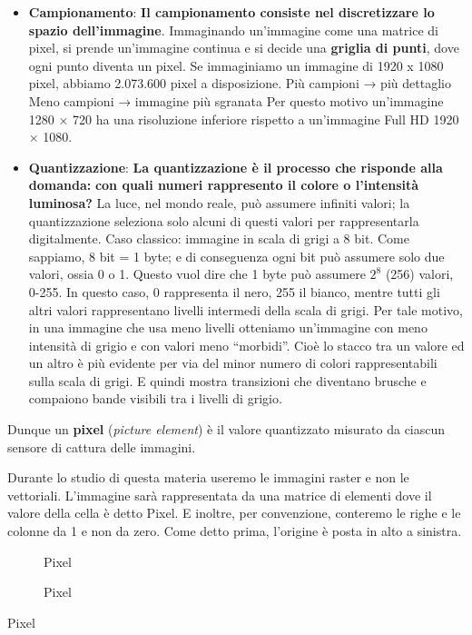 \documentclass[
]{article}
\providecommand{\tightlist}{%
  \setlength{\itemsep}{0pt}\setlength{\parskip}{0pt}}
\begin{document}
\begin{itemize}
\tightlist
\item
  \textbf{Campionamento}:
  \textbf{Il campionamento consiste nel discretizzare lo spazio dell'immagine}. Immaginando un'immagine come una matrice di pixel, si prende un'immagine continua e si decide una \textbf{griglia di punti}, dove ogni punto diventa un pixel.
  Se immaginiamo un immagine di 1920 x 1080 pixel, abbiamo 2.073.600 pixel a disposizione.
  Più campioni → più dettaglio
  Meno campioni → immagine più sgranata
  Per questo motivo un'immagine 1280 × 720 ha una risoluzione inferiore rispetto a un'immagine Full HD 1920 × 1080.
\item
  \textbf{Quantizzazione}:
  \textbf{La quantizzazione è il processo che risponde alla domanda:} \textbf{con quali numeri rappresento il colore o l'intensità luminosa?} La luce, nel mondo reale, può assumere infiniti valori; la quantizzazione seleziona solo alcuni di questi valori per rappresentarla digitalmente.
  Caso classico: immagine in scala di grigi a 8 bit.
  Come sappiamo, 8 bit = 1 byte; e di conseguenza ogni bit può assumere solo due valori, ossia 0 o 1. Questo vuol dire che 1 byte può assumere \(2^8\) (256) valori, 0-255. In questo caso, 0 rappresenta il nero, 255 il bianco, mentre tutti gli altri valori rappresentano livelli intermedi della scala di grigi.
  Per tale motivo, in una immagine che usa meno livelli otteniamo un'immagine con meno intensità di grigio e con valori meno ``morbidi''. Cioè lo stacco tra un valore ed un altro è più evidente per via del minor numero di colori rappresentabili sulla scala di grigi. E quindi mostra transizioni che diventano brusche e compaiono bande visibili tra i livelli di grigio.
\end{itemize}

Dunque un \textbf{pixel} (\emph{picture element}) è il valore quantizzato misurato da ciascun sensore di cattura delle immagini.

Durante lo studio di questa materia useremo le immagini raster e non le vettoriali. L'immagine sarà rappresentata da una matrice di elementi dove il valore della cella è detto Pixel. E inoltre, per convenzione, conteremo le righe e le colonne da 1 e non da zero. Come detto prima, l'origine è posta in alto a sinistra.

\begin{figure}
\centering
{Pixel}
\caption{Pixel}
\end{figure}

Pixel
\end{document}

